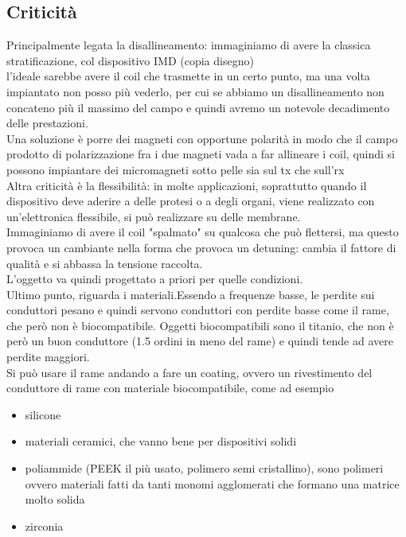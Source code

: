 \documentclass[oneside, 12pt]{extbook}
\begin{document}
\subsection{Criticità}
Principalmente legata la disallineamento: immaginiamo di avere la classica stratificazione, col dispositivo IMD (copia disegno)\\l'ideale sarebbe avere il coil che trasmette in un certo punto, ma una volta impiantato non posso più vederlo, per cui se abbiamo un disallineamento non concateno più il massimo del campo e quindi avremo un notevole decadimento delle prestazioni.\\Una soluzione è porre dei magneti con opportune polarità in modo che il campo prodotto di polarizzazione fra i due magneti vada a far allineare i coil, quindi si possono impiantare dei micromagneti sotto pelle sia sul tx che sull'rx\\Altra criticità è la flessibilità: in molte applicazioni, soprattutto quando il dispositivo deve aderire a delle protesi o a degli organi, viene realizzato con un'elettronica flessibile, si può realizzare su delle membrane.\\Immaginiamo di avere il coil "spalmato" su qualcosa che può flettersi, ma questo provoca un cambiante nella forma che provoca un detuning: cambia il fattore di qualità e si abbassa la tensione raccolta.\\L'oggetto va quindi progettato a priori per quelle condizioni.\\Ultimo punto, riguarda i materiali.Essendo a frequenze basse, le perdite sui conduttori pesano e quindi servono conduttori con perdite basse come il rame, che però non è biocompatibile. Oggetti biocompatibili sono il titanio, che non è però un buon conduttore (1.5 ordini in meno del rame) e quindi tende ad avere perdite maggiori.\\Si può usare il rame andando a fare un coating, ovvero un rivestimento del conduttore di rame con materiale biocompatibile, come ad esempio
\begin{itemize}
	\item silicone
	\item materiali ceramici, che vanno bene per dispositivi solidi
	\item poliammide (PEEK il più usato, polimero semi cristallino), sono polimeri ovvero materiali fatti da tanti monomi agglomerati che formano una matrice molto solida
	\item zirconia
\end{itemize}
\end{document}
